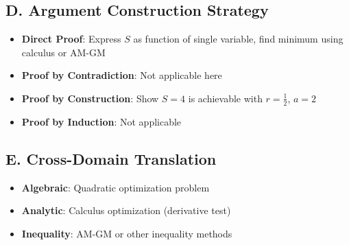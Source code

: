 \documentclass[12pt]{article}
\begin{document}
\begin{strategicbox}
\subsection*{D. Argument Construction Strategy}
\begin{itemize}[leftmargin=*]
    \item \textbf{Direct Proof}: Express $S$ as function of single variable, find minimum using calculus or AM-GM
    \item \textbf{Proof by Contradiction}: Not applicable here
    \item \textbf{Proof by Construction}: Show $S = 4$ is achievable with $r = \frac{1}{2}$, $a = 2$
    \item \textbf{Proof by Induction}: Not applicable
\end{itemize}

\subsection*{E. Cross-Domain Translation}
\begin{itemize}[leftmargin=*]
    \item \textbf{Algebraic}: Quadratic optimization problem
    \item \textbf{Analytic}: Calculus optimization (derivative test)
    \item \textbf{Inequality}: AM-GM or other inequality methods
\end{itemize}
\end{strategicbox}
\end{document}
